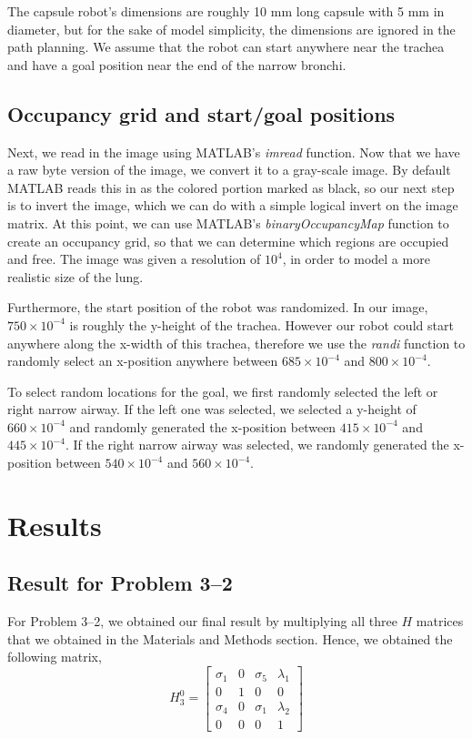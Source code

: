 \documentclass[conference]{IEEEtran}
\begin{document}
The capsule robot's dimensions are roughly 10 mm long capsule with 5 mm in diameter,
but for the sake of model simplicity, the dimensions are ignored in the
path planning. We assume that the robot can start anywhere near the trachea
and have a goal position near the end of the narrow bronchi.

\subsection{Occupancy grid and start/goal positions}

Next, we read in the image using MATLAB's \textit{imread} function. Now
that we have a raw byte version of the image, we convert it to
a gray-scale image. By default MATLAB reads this in as the colored
portion marked as black, so our next step is to invert the image,
which we can do with a simple logical invert on the image matrix.
At this point, we can use MATLAB's \textit{binaryOccupancyMap} function
to create an occupancy grid, so that we can determine which
regions are occupied and free. The image was given a resolution
of $10^4$, in order to model a more realistic size of the lung.

Furthermore, the start position of the robot was randomized. In our
image, $750 \times 10^{-4}$ is roughly the y-height of the trachea.
However our robot could start anywhere along the x-width of this trachea,
therefore we use the \textit{randi} function to randomly select an
x-position anywhere between $685 \times 10^{-4}$ and $800 \times 10^{-4}$.

To select random locations for the goal, we first randomly selected
the left or right narrow airway. If the left one was selected, we
selected a y-height of $660 \times 10^{-4}$ and randomly generated
the x-position between $415 \times 10^{-4}$ and $445 \times 10^{-4}$.
If the right narrow airway was selected, we randomly generated the x-position
between $540 \times 10^{-4}$ and $560 \times 10^{-4}$.

\section{Results}

\subsection{Result for Problem 3--2}

For Problem 3--2, we obtained our final result by multiplying all three $H$ matrices
that we obtained in the Materials and Methods section. Hence, we obtained the following
matrix,
\[
    H^0_3 =
    \begin{bmatrix}
        \sigma_1  & 0 & \sigma_5  & \lambda_1\\
        0 & 1 & 0 & 0\\
        \sigma_4  & 0 & \sigma_1  & \lambda_2\\
        0 & 0 & 0 & 1
    \end{bmatrix}
\]
\end{document}

